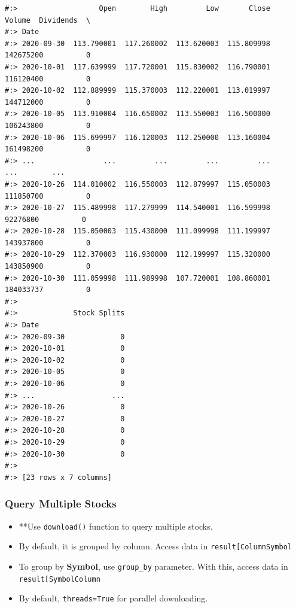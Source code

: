 \documentclass[
]{book}
\providecommand{\tightlist}{%
  \setlength{\itemsep}{0pt}\setlength{\parskip}{0pt}}
\begin{document}
\begin{verbatim}
#:>                   Open        High         Low       Close     Volume  Dividends  \
#:> Date                                                                               
#:> 2020-09-30  113.790001  117.260002  113.620003  115.809998  142675200          0   
#:> 2020-10-01  117.639999  117.720001  115.830002  116.790001  116120400          0   
#:> 2020-10-02  112.889999  115.370003  112.220001  113.019997  144712000          0   
#:> 2020-10-05  113.910004  116.650002  113.550003  116.500000  106243800          0   
#:> 2020-10-06  115.699997  116.120003  112.250000  113.160004  161498200          0   
#:> ...                ...         ...         ...         ...        ...        ...   
#:> 2020-10-26  114.010002  116.550003  112.879997  115.050003  111850700          0   
#:> 2020-10-27  115.489998  117.279999  114.540001  116.599998   92276800          0   
#:> 2020-10-28  115.050003  115.430000  111.099998  111.199997  143937800          0   
#:> 2020-10-29  112.370003  116.930000  112.199997  115.320000  143850900          0   
#:> 2020-10-30  111.059998  111.989998  107.720001  108.860001  184033737          0   
#:> 
#:>             Stock Splits  
#:> Date                      
#:> 2020-09-30             0  
#:> 2020-10-01             0  
#:> 2020-10-02             0  
#:> 2020-10-05             0  
#:> 2020-10-06             0  
#:> ...                  ...  
#:> 2020-10-26             0  
#:> 2020-10-27             0  
#:> 2020-10-28             0  
#:> 2020-10-29             0  
#:> 2020-10-30             0  
#:> 
#:> [23 rows x 7 columns]
\end{verbatim}

\hypertarget{query-multiple-stocks-1}{%
\subsubsection{Query Multiple Stocks}\label{query-multiple-stocks-1}}

\begin{itemize}
\tightlist
\item
  **Use \texttt{download()} function to query multiple stocks.\\
\item
  By default, it is grouped by column. Access data in \texttt{result{[}\textquotesingle{}Column\textquotesingle{}{]}{[}\textquotesingle{}Symbol\textquotesingle{}{]}}\\
\item
  To group by \textbf{Symbol}, use \texttt{group\_by} parameter. With this, access data in \texttt{result{[}\textquotesingle{}Symbol\textquotesingle{}{]}{[}\textquotesingle{}Column\textquotesingle{}{]}}\\
\item
  By default, \texttt{threads=True} for parallel downloading.
\end{itemize}
\end{document}
